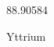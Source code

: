 \documentclass[12pt]{article}
\begin{document}
\hfill{}
\vfill
\begin{center}
  {\fontsize{50}{60}
  }

  \vspace{1em}

  88.90584

Yttrium
\end{center}
\vfill
\end{document}
